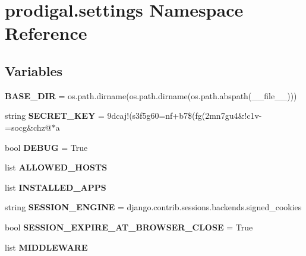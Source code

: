 \hypertarget{namespaceprodigal_1_1settings}{}\section{prodigal.\+settings Namespace Reference}
\label{namespaceprodigal_1_1settings}
\subsection*{Variables}
\begin{DoxyCompactItemize}
\item 
\mbox{\label{namespaceprodigal_1_1settings_afdcbeab814b177438302a04e53eedfc8}} 
{\bfseries B\+A\+S\+E\+\_\+\+D\+IR} = os.\+path.\+dirname(os.\+path.\+dirname(os.\+path.\+abspath(\+\_\+\+\_\+file\+\_\+\+\_\+)))
\item 
\mbox{\label{namespaceprodigal_1_1settings_aa7d3531c9e12fb6707109e83efbf337c}} 
string {\bfseries S\+E\+C\+R\+E\+T\+\_\+\+K\+EY} = \textquotesingle{}9dcaj!(s3f5g60=nf+b7\$(fg(2mn7gu4\&!c1v-\/=socg\&chz@$\ast$a\textquotesingle{}
\item 
\mbox{\label{namespaceprodigal_1_1settings_ab50d2e71655cbd9cff833f3f3070c9cc}} 
bool {\bfseries D\+E\+B\+UG} = True
\item 
list {\bfseries A\+L\+L\+O\+W\+E\+D\+\_\+\+H\+O\+S\+TS}
\item 
list {\bfseries I\+N\+S\+T\+A\+L\+L\+E\+D\+\_\+\+A\+P\+PS}
\item 
\mbox{\label{namespaceprodigal_1_1settings_a198fe2f1de96db95e46bdaff10711712}} 
string {\bfseries S\+E\+S\+S\+I\+O\+N\+\_\+\+E\+N\+G\+I\+NE} = \textquotesingle{}django.\+contrib.\+sessions.\+backends.\+signed\+\_\+cookies\textquotesingle{}
\item 
\mbox{\label{namespaceprodigal_1_1settings_a7d5eecfa4d3e4fe734b01195103fbd49}} 
bool {\bfseries S\+E\+S\+S\+I\+O\+N\+\_\+\+E\+X\+P\+I\+R\+E\+\_\+\+A\+T\+\_\+\+B\+R\+O\+W\+S\+E\+R\+\_\+\+C\+L\+O\+SE} = True
\item 
list {\bfseries M\+I\+D\+D\+L\+E\+W\+A\+RE}
\item 
\mbox{\label{namespaceprodigal_1_1settings_a4ef3599ee045dfa27df5da5f1876ae1f}} 

\end{DoxyCompactItemize}
